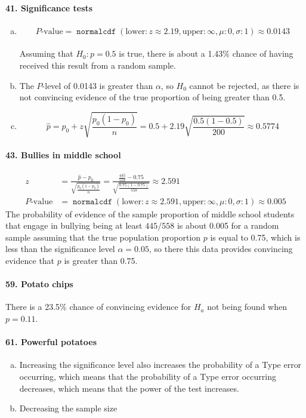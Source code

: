 \documentclass[12pt, A4]{article}
\DeclareMathOperator{\normalcdf}{\texttt{normalcdf}}
\newcommand{\normalCDF}[4]{\normalcdf\left(\mathrm{lower}: #1, \mathrm{upper}: #2, \mu: #3, \sigma: #4\right)}
\newcommand{\propse}[2]{\sqrt{\frac{#1\left(1 - #1\right)}{#2}}}
\newcommand{\z}[3]{\frac{#1 - #2}{#3}}
\renewcommand{\Roman}[1]{\MakeUppercase{\romannumeral #1}}
\begin{document}
			\paragraph{41. Significance tests}
				\begin{enumerate}[a.]
					\item
						$$P\text{-value} = \normalCDF{z \approx 2.19}{\infty}{0}{1} \approx 0.0143$$ \\
						Assuming that $H_0:p = 0.5$ is true, there is about a 1.43\% chance of having received this result from a random sample.
					\item
						The $P$-level of 0.0143 is greater than $\alpha$, so $H_0$ cannot be rejected, as there is not convincing evidence of the true proportion of being greater than 0.5.
					\item
						$$\hat{p} = p_0 + z\propse{p_0}{n} = 0.5 + 2.19\propse{0.5}{200} \approx 0.5774$$
				\end{enumerate}
			\paragraph{43. Bullies in middle school}
				\begin{align*}
					z &= \z{\hat{p}}{p_0}{\propse{p_0}{n}} = \z{\frac{445}{558}}{0.75}{\propse{0.75}{558}} \approx 2.591 \\ 
					P\text{-value} &= \normalCDF{z \approx 2.591}{\infty}{0}{1} \approx 0.005
				\end{align*}
				The probability of evidence of the sample proportion of middle school students that engage in bullying being at least $445/558$ is about 0.005 for a random sample assuming that the true population proportion $p$ is equal to 0.75, which is less than the significance level $\alpha = 0.05$, so there this data provides convincing evidence that $p$ is greater than 0.75.
			\paragraph{59. Potato chips}
				There is a 23.5\% chance of convincing evidence for $H_a$ not being found when $p = 0.11$.
			\paragraph{61. Powerful potatoes}
				\begin{enumerate}[a.]
					\item
						Increasing the significance level also increases the probability of a Type \Roman{1} error occurring, which means that the probability of a Type \Roman{2} error occurring decreases, which means that the power of the test increases.
					\item
						Decreasing the sample size
				\end{enumerate}
\end{document}
